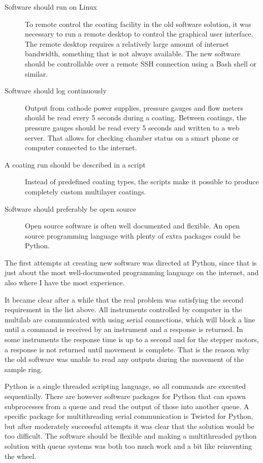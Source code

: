 \begin{description}
  \item[Software should run on Linux] To remote control the coating facility in the old software solution, it was necessary to run a remote desktop to control the graphical user interface. The remote desktop requires a relatively large amount of internet bandwidth, something that is not always available. The new software should be controllable over a remote SSH connection using a Bash shell or similar.
  \item[Software should log continuously] Output from cathode power supplies, pressure gauges and flow meters should be read every 5 seconds during a coating. Between coatings, the pressure gauges should be read every 5 seconds and written to a web server. That allows for checking chamber status on a smart phone or computer connected to the internet.
  \item[A coating run should be described in a script] Instead of predefined coating types, the scripts make it possible to produce completely custom multilayer coatings.
  \item[Software should preferably be open source] Open source software is often well documented and flexible. An open source programming language with plenty of extra packages could be Python.
\end{description}

The first attempts at creating new software was directed at Python, since that is just about the most well-documented programming language on the internet, and also where I have the most experience.

It became clear after a while that the real problem was satisfying the second requirement in the list above. All instruments controlled by computer in the multilab are communicated with using serial connections, which will block a line until a command is received by an instrument and a response is returned. In some instruments the response time is up to a second and for the stepper motors, a response is not returned until movement is complete. That is the reason why the old software was unable to read any outputs during the movement of the sample ring.

Python is a single threaded scripting language, so all commands are executed sequentially. There are however software packages for Python that can spawn subprocesses from a queue and read the output of those into another queue. A specific package for multithreading serial communication is Twisted for Python, but after moderately successful attempts it was clear that the solution would be too difficult. The software should be flexible and making a multithreaded python solution with queue systems was both too much work and a bit like reinventing the wheel.

